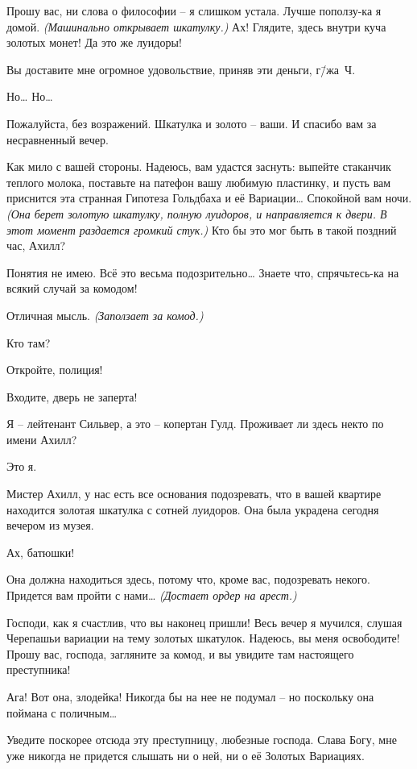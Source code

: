 \documentclass[../main.tex]{subfiles}
\begin{document}
\begin{dialogue}
 Прошу вас, ни слова о философии \--- я слишком устала. Лучше поползу-ка я домой. \emph{(Машинально открывает шкатулку.)} Ах! Глядите, здесь внутри куча золотых монет! Да это же луидоры!

 Вы доставите мне огромное удовольствие, приняв эти деньги, г\=/жа~Ч.

 Но\ldots{} Но\ldots{}

 Пожалуйста, без возражений. Шкатулка и золото \--- ваши. И спасибо вам за несравненный вечер.

 Как мило с вашей стороны. Надеюсь, вам удастся заснуть: выпейте стаканчик теплого молока, поставьте на патефон вашу любимую пластинку, и пусть вам приснится эта странная Гипотеза Гольдбаха и её Вариации\ldots{} Спокойной вам ночи. \emph{(Она берет золотую шкатулку, полную луидоров, и направляется к двери. В этот момент раздается громкий стук.)} Кто бы это мог быть в такой поздний час, Ахилл?

 Понятия не имею. Всё это весьма подозрительно\ldots{} Знаете что, спрячьтесь-ка на всякий случай за комодом!

 Отличная мысль. \emph{(Заползает за комод.)}

 Кто там?

 Откройте, полиция!

 Входите, дверь не заперта!


 Я \--- лейтенант Сильвер, а это \--- копертан Гулд. Проживает ли здесь некто по имени Ахилл?

 Это я.

 Мистер Ахилл, у нас есть все основания подозревать, что в вашей квартире находится золотая шкатулка с сотней луидоров. Она была украдена сегодня вечером из музея.

 Ах, батюшки!

 Она должна находиться здесь, потому что, кроме вас, подозревать некого. Придется вам пройти с нами\ldots{} \emph{(Достает ордер на арест.)}

 Господи, как я счастлив, что вы наконец пришли! Весь вечер я мучился, слушая Черепашьи вариации на тему золотых шкатулок. Надеюсь, вы меня освободите! Прошу вас, господа, загляните за комод, и вы увидите там настоящего преступника!


 Ага! Вот она, злодейка! Никогда бы на нее не подумал \--- но поскольку она поймана с поличным\ldots{}

 Уведите поскорее отсюда эту преступницу, любезные господа. \mbox{Слава} Богу, мне уже никогда не придется слышать ни о ней, ни о её Золотых Вариациях.

\end{dialogue}
\end{document}
